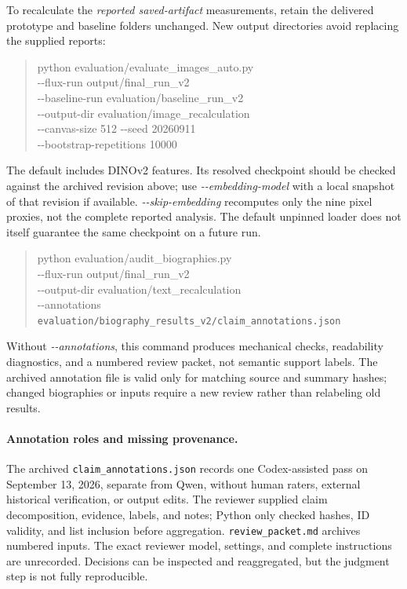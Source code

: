 To recalculate the \emph{reported saved-artifact} measurements, retain the delivered prototype and baseline folders unchanged. New output directories avoid replacing the supplied reports:
\begin{quote}\small\raggedright
python evaluation/evaluate\_images\_auto.py \ShellContinue{}\\
\quad -{}-flux-run output/final\_run\_v2 \ShellContinue{}\\
\quad -{}-baseline-run evaluation/baseline\_run\_v2 \ShellContinue{}\\
\quad -{}-output-dir evaluation/image\_recalculation \ShellContinue{}\\
\quad -{}-canvas-size 512 -{}-seed 20260911 \ShellContinue{}\\
\quad -{}-bootstrap-repetitions 10000
\end{quote}
The default includes DINOv2 features. Its resolved checkpoint should be checked against the archived revision above; use \emph{-{}-embedding-model} with a local snapshot of that revision if available. \emph{-{}-skip-embedding} recomputes only the nine pixel proxies, not the complete reported analysis. The default unpinned loader does not itself guarantee the same checkpoint on a future run.

\begin{quote}\small\raggedright
python evaluation/audit\_biographies.py \ShellContinue{}\\
\quad -{}-flux-run output/final\_run\_v2 \ShellContinue{}\\
\quad -{}-output-dir evaluation/text\_recalculation \ShellContinue{}\\
\quad -{}-annotations \nolinkurl{evaluation/biography_results_v2/claim_annotations.json}
\end{quote}
Without \emph{-{}-annotations}, this command produces mechanical checks, readability diagnostics, and a numbered review packet, not semantic support labels. The archived annotation file is valid only for matching source and summary hashes; changed biographies or inputs require a new review rather than relabeling old results.

\paragraph{Annotation roles and missing provenance.}
The archived \nolinkurl{claim_annotations.json} records one Codex-assisted pass on September 13, 2026, separate from Qwen, without human raters, external historical verification, or output edits. The reviewer supplied claim decomposition, evidence, labels, and notes; Python only checked hashes, ID validity, and list inclusion before aggregation. \nolinkurl{review_packet.md} archives numbered inputs. The exact reviewer model, settings, and complete instructions are unrecorded. Decisions can be inspected and reaggregated, but the judgment step is not fully reproducible.

